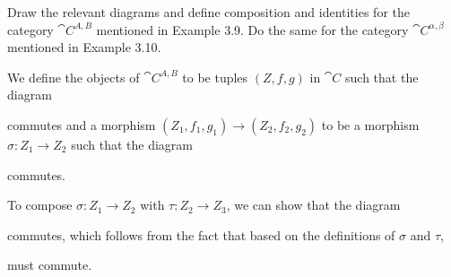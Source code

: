 \documentclass[notes,tikz]{agony}
\begin{document}
\begin{xca}
  Draw the relevant diagrams and define composition and identities for the
  category $\cat C^{A,B}$ mentioned in Example 3.9.
  Do the same for the category $\cat C^{\alpha,\beta}$ mentioned in Example 3.10.
\end{xca}
\begin{sol}
  We define the objects of $\cat C^{A,B}$ to be tuples $(Z,f,g)$ in $\cat C$
  such that the diagram
  \begin{center}
  \end{center}
  commutes and a morphism $(Z_1,f_1,g_1) \to (Z_2,f_2,g_2)$ to be a morphism $\sigma : Z_1 \to Z_2$
  such that the diagram
  \begin{center}
  \end{center}
  commutes.

  To compose $\sigma : Z_1 \to Z_2$ with $\tau : Z_2 \to Z_3$,
  we can show that the diagram
  \begin{center}
  \end{center}
  commutes, which follows from the fact that based on the definitions of $\sigma$ and $\tau$,
  \begin{center}
  \end{center}
  must commute.


\end{sol}
\end{document}
